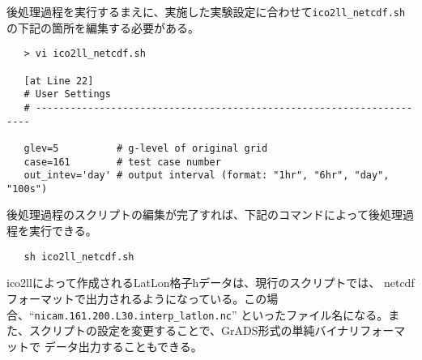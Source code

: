後処理過程を実行するまえに、実施した実験設定に合わせて\verb|ico2ll_netcdf.sh|
の下記の箇所を編集する必要がある。
 \begin{verbatim}
   > vi ico2ll_netcdf.sh

   [at Line 22]
   # User Settings
   # ---------------------------------------------------------------------

   glev=5          # g-level of original grid
   case=161        # test case number
   out_intev='day' # output interval (format: "1hr", "6hr", "day", "100s")
 \end{verbatim}

 \noindent 後処理過程のスクリプトの編集が完了すれば、下記のコマンドによって後処理過程を実行できる。
 \begin{verbatim}
   sh ico2ll_netcdf.sh
 \end{verbatim}


 \noindent ico2llによって作成されるLatLon格子hデータは、現行のスクリプトでは、
netcdfフォーマットで出力されるようになっている。この場合、``\verb|nicam.161.200.L30.interp_latlon.nc|''
といったファイル名になる。また、スクリプトの設定を変更することで、GrADS形式の単純バイナリフォーマットで
データ出力することもできる。

